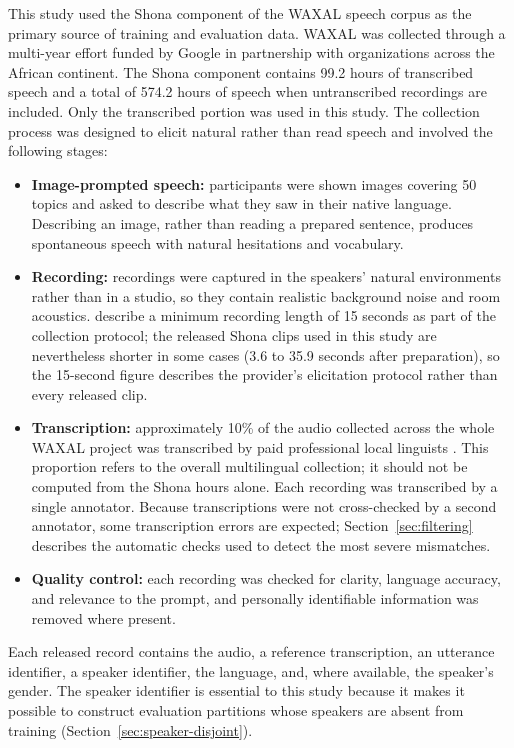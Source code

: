 This study used the Shona component of the WAXAL speech corpus \citep{Diack2026}
as the primary source of training and evaluation data. WAXAL was collected
through a multi-year effort funded by Google in partnership with organizations
across the African continent. The Shona component contains 99.2 hours of
transcribed speech and a total of 574.2 hours of speech when untranscribed
recordings are included. Only the transcribed portion was used in this study.
The collection process was designed to elicit natural rather than read speech
and involved the following stages:

\begin{itemize}
    \item \textbf{Image-prompted speech:} participants were shown images covering
    50 topics and asked to describe what they saw in their native language.
    Describing an image, rather than reading a prepared sentence, produces
    spontaneous speech with natural hesitations and vocabulary.
    \item \textbf{Recording:} recordings were captured in the speakers' natural
    environments rather than in a studio, so they contain realistic background
    noise and room acoustics. \citet{Diack2026} describe a minimum recording
    length of 15 seconds as part of the collection protocol; the released Shona
    clips used in this study are nevertheless shorter in some cases (3.6 to 35.9
    seconds after preparation), so the 15-second figure describes the provider's
    elicitation protocol rather than every released clip.
    \item \textbf{Transcription:} approximately 10\% of the audio collected
    across the whole WAXAL project was transcribed by paid professional local
    linguists \citep{Diack2026}. This proportion refers to the overall
    multilingual collection; it should not be computed from the Shona hours
    alone. Each recording was transcribed by a single annotator.
    Because transcriptions were not cross-checked by a second annotator, some
    transcription errors are expected; Section~\ref{sec:filtering} describes the
    automatic checks used to detect the most severe mismatches.
    \item \textbf{Quality control:} each recording was checked for clarity,
    language accuracy, and relevance to the prompt, and personally identifiable
    information was removed where present.
\end{itemize}

Each released record contains the audio, a reference transcription, an
utterance identifier, a speaker identifier, the language, and, where available,
the speaker's gender. The speaker identifier is essential to this study because
it makes it possible to construct evaluation partitions whose speakers are absent
from training (Section~\ref{sec:speaker-disjoint}).

